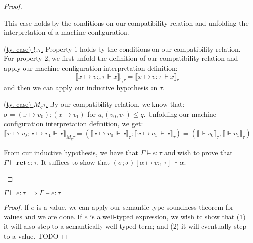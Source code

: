 \begin{proof}
\begin{description}
\begin{description}
\begin{description}
            This case holds by the conditions on our compatibility relation and
            unfolding the interpretation of a machine configuration.
          \item{\underline{(ty. case) $!_s \tau$.}} 
            Property 1 holds by the conditions on our compatibility relation.
            For property 2, we first 
            unfold the definition of our
            compatibility relation and apply our machine configuration
            interpretation definition:
            $$ 
            \llbracket x \mapsto v :_s \tau \Vdash x \rrbracket_{!_s \tau} = 
            \llbracket x \mapsto v : \tau \Vdash x \rrbracket_{\tau}
            $$
            and then we can apply our inductive hypothesis on $\tau$.
          \item{\underline{(ty. case) $M_q \tau$.}}
            By our compatibility relation, we know that: $\sigma = (x \mapsto
            v_0);(x \mapsto v_1)$ for $d_{\tau}(v_0, v_1) \leq q$. Unfolding our
            machine configuration interpretation definition, we get:
            $$
            \llbracket x \mapsto v_0; x \mapsto v_1 \Vdash x \rrbracket_{M_q
            \tau} = 
            (\llbracket x \mapsto v_0 \Vdash x \rrbracket_{\tau}; \llbracket x
            \mapsto v_1 \Vdash x \rrbracket_{\tau}) = 
            (\llbracket \Vdash v_0 \rrbracket_{\tau}, \llbracket \Vdash v_1
            \rrbracket_{\tau})
            $$
        \end{description}
      \item[\textit{(env. size) n + 1.}] 
    \end{description}
  \item[\textsc{(ty. rule) Ret.}] 
    From our inductive hypothesis, we have that $\Gamma \vDash e : \tau$ and
    wish to prove that $\Gamma \vDash \mathbf{ret} \ e : \tau$. It suffices to
    show that $(\sigma; \sigma)[\alpha \mapsto v:_1 \tau] \Vdash \alpha$.
  \item[\textsc{(ty. rule) Rnd.}]
\end{description}
\end{proof}

\begin{theorem}
$\Gamma \vdash e : \tau \implies \Gamma \vDash e : \tau$
\end{theorem}
\begin{proof}
  If $e$ is a value, we can apply our semantic type soundness theorem for values
  and we are done. If $e$ is a well-typed expression, we wish to show that (1)
  it will also step to a semantically well-typed term; and (2) it will
  eventually step to a value.
  TODO
\end{proof}

